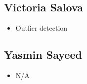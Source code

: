 \documentclass[letterpaper, 12 pt, conference]{ieeeconf}  %
\begin{document}
\subsection*{Victoria Salova}
        \begin{itemize}
                \item Outlier detection
        \end{itemize}

\subsection*{Yasmin Sayeed}
        \begin{itemize}
                \item N/A
        \end{itemize}
\end{document}
